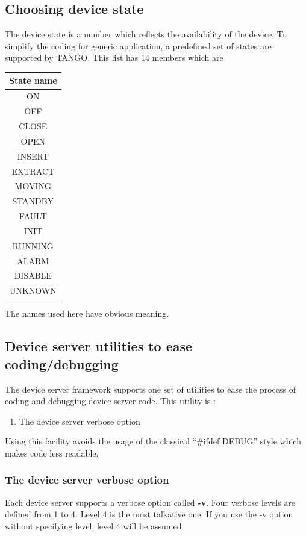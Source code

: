 \subsection{Choosing device state}

The device state is a number which reflects the availability
of the device. To simplify the coding for generic application, a predefined
set of states are supported by TANGO. This list has
14 members which are

\vspace{0.3cm}


\begin{center}
\begin{longtable}{|c|}
\hline 
State name\tabularnewline
\hline 
\hline 
ON\tabularnewline
\hline 
OFF\tabularnewline
\hline 
CLOSE\tabularnewline
\hline 
OPEN\tabularnewline
\hline 
INSERT\tabularnewline
\hline 
EXTRACT\tabularnewline
\hline 
MOVING\tabularnewline
\hline 
STANDBY\tabularnewline
\hline 
FAULT\tabularnewline
\hline 
INIT\tabularnewline
\hline 
RUNNING\tabularnewline
\hline 
ALARM\tabularnewline
\hline 
DISABLE\tabularnewline
\hline 
UNKNOWN\tabularnewline
\hline 
\end{longtable}
\par\end{center}

\vspace{0.3cm}


The names used here have obvious meaning.


\subsection{Device server utilities to ease coding/debugging}

The device server framework supports one set of utilities to ease
the process of coding and debugging device server code.
This utility is :
\begin{enumerate}
\item The device server verbose option
\end{enumerate}
Using this facility avoids the usage of the classical ``\#ifdef DEBUG''
style which makes code less readable.


\subsubsection{The device server verbose option}

Each device server supports a verbose option called
\textbf{-v}. Four verbose levels are defined from 1 to
4. Level 4 is the most talkative one. If you use the -v option without
specifying level, level 4 will be assumed.

